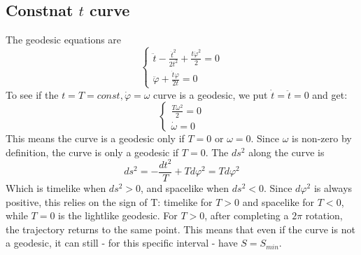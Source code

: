 \documentclass{article}
\begin{document}
\subsection{Constnat $t$ curve}
The geodesic equations are
\begin{equation}
    \begin{cases}
        \ddot{t} -\frac{\dot{t}^2}{2t^2} + \frac{t\dot{\varphi}^2}{2} = 0
        \\
        \ddot{\varphi} + \frac{\dot{t}\varphi}{2t} = 0
    \end{cases}
\end{equation}
To see if the $t=T=const, \dot{\varphi} = \omega$ curve is a geodesic, we put $\dot{t} = \ddot{t} = 0$ and get:
\begin{equation}
    \begin{cases}
        \frac{T\omega^2}{2} = 0
        \\
        \dot{\omega} = 0
    \end{cases}
\end{equation}
This means the curve is a geodesic only if $T = 0$ or $\omega = 0$. Since $\omega$ is non-zero by definition, the curve is only a geodesic if $T = 0$.
The $ds^2$ along the curve is
\begin{equation}
    ds^2 = -\frac{dt^2}{T} + Td\varphi^2 = Td\varphi^2
\end{equation}  
Which is timelike when $ds^2 > 0$, and spacelike when $ds^2 < 0$. Since $d\varphi^2$ is always positive, this relies on the sign of T: timelike for $T > 0$ and spacelike for $T < 0$, while $T = 0$ is the lightlike geodesic.
\newline
For $T > 0$, after completing a $2\pi$ rotation, the trajectory returns to the same point. This means that even if the curve is not a geodesic, it can still - for this specific interval - have $S = S_{min}$.
\end{document}
